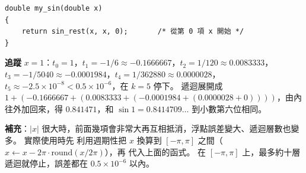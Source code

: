 \begin{pastsoln}
\begin{verbatim}
double my_sin(double x)
{
    return sin_rest(x, x, 0);       /* 從第 0 項 x 開始 */
}
\end{verbatim}
\textbf{追蹤} $x = 1$：$t_0 = 1$，$t_1 = -1/6 \approx -0.1666667$，$t_2 = 1/120 \approx 0.0083333$，
$t_3 = -1/5040 \approx -0.0001984$，$t_4 = 1/362880 \approx 0.0000028$，$t_5 \approx -2.5 \times 10^{-8}
< 0.5 \times 10^{-6}$，在 $k = 5$ 停下。 遞迴展開成 $1 + (-0.1666667 + (0.0083333 + (-0.0001984 +
(0.0000028 + 0))))$，由內往外加回來，得 $0.841471$，和 $\sin 1 = 0.8414709\ldots$ 到小數第六位相同。

\textbf{補充}：$|x|$ 很大時，前面幾項會非常大再互相抵消，浮點誤差變大、遞迴層數也變多。 實際使用時先
利用週期性把 $x$ 換算到 $[-\pi, \pi]$ 之間（$x \gets x - 2\pi \cdot \mathrm{round}(x / 2\pi)$），再
代入上面的函式。 在 $[-\pi, \pi]$ 上，最多約十層遞迴就停止，誤差都在 $0.5 \times 10^{-6}$ 以內。
\end{pastsoln}
